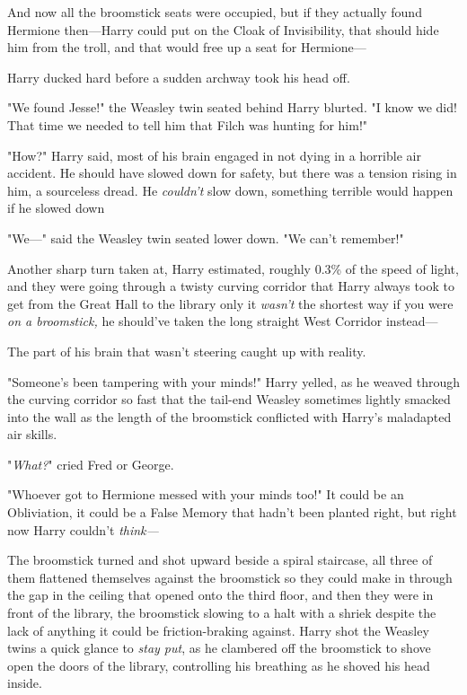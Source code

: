 And now all the broomstick seats were occupied, but if they actually found
Hermione then---Harry could put on the Cloak of Invisibility, that should hide
him from the troll, and that would free up a seat for Hermione---

Harry ducked hard before a sudden archway took his head off.

"We found Jesse!" the Weasley twin seated behind Harry blurted. "I know we did!
That time we needed to tell him that Filch was hunting for him!"

"How?" Harry said, most of his brain engaged in not dying in a horrible air
accident. He should have slowed down for safety, but there was a tension rising
in him, a sourceless dread. He \emph{couldn't} slow down, something terrible
would happen if he slowed down{\el}

"We\mbox{---}" said the Weasley twin seated lower down. "We can't remember!"

Another sharp turn taken at, Harry estimated, roughly 0.3\% of the speed of
light, and they were going through a twisty curving corridor that Harry always
took to get from the Great Hall to the library only it \emph{wasn't} the
shortest way if you were \emph{on a broomstick,} he should've taken the long
straight West Corridor instead---

The part of his brain that wasn't steering caught up with reality.

"Someone's been tampering with your minds!" Harry yelled, as he weaved through
the curving corridor so fast that the tail-end Weasley sometimes lightly
smacked into the wall as the length of the broomstick conflicted with Harry's
maladapted air skills.

"\emph{What?}" cried Fred or George.

"Whoever got to Hermione messed with your minds too!" It could be an
Obliviation, it could be a False Memory that hadn't been planted right, but
right now Harry couldn't \emph{think---}

The broomstick turned and shot upward beside a spiral staircase, all three of
them flattened themselves against the broomstick so they could make in through
the gap in the ceiling that opened onto the third floor, and then they were in
front of the library, the broomstick slowing to a halt with a shriek despite
the lack of anything it could be friction-braking against. Harry shot the
Weasley twins a quick glance to \emph{stay put}, as he clambered off the
broomstick to shove open the doors of the library, controlling his breathing as
he shoved his head inside.

